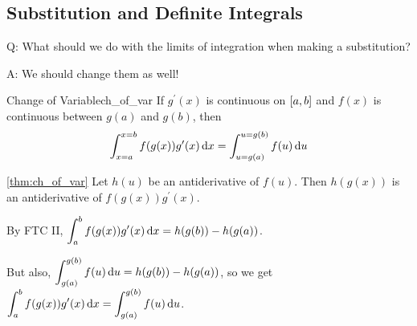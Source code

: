 \subsection*{Substitution and Definite Integrals}
Q\@: What should we do with the limits of integration when making a substitution?

A\@: We should change them as well!

\begin{Theorem}{Change of Variable}{ch_of_var}
    If $ g^\prime(x) $ is continuous on $ \interval{a}{b} $ and $ f(x) $
    is continuous between $ g(a) $ and $ g(b) $, then
    \[ \int_{x=a}^{x=b} f(g(x))g^\prime(x)\odif{x} =
        \int_{u=g(a)}^{u=g(b)} f(u)\odif{u}  \]
\end{Theorem}

\begin{Proof}{\ref{thm:ch_of_var}}{}
    Let $ h(u) $ be an antiderivative of $ f(u) $. Then $ h(g(x)) $
    is an antiderivative of $ f(g(x))g^\prime(x) $.

    By FTC II,
    $ \displaystyle\int_{a}^{b} f(g(x))g^\prime(x)\odif{x} =h(g(b))-h(g(a)) $.

    But also,
    $ \displaystyle\int_{g(a)}^{g(b)} f(u)\odif{u} =h(g(b))-h(g(a)) $,
    so we get
    $ \displaystyle\int_{a}^{b} f(g(x))g^\prime(x)\odif{x} =\int_{g(a)}^{g(b)} f(u)\odif{u} $.
\end{Proof}

